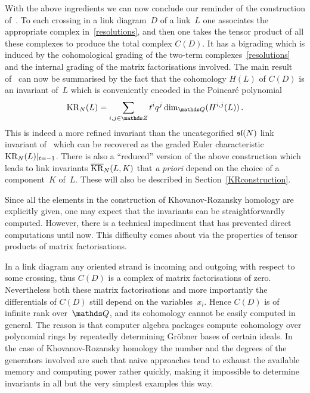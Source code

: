 \documentclass{compositio}
\theoremstyle{definition}
\numberwithin{equation}{section}
\begin{document}
With the above ingredients we can now conclude our reminder of the construction of~\cite{kr0401268}. To each crossing in a link diagram~$D$ of a link~$L$ one associates the appropriate complex in~\eqref{resolutions}, and then one takes the tensor product of all these complexes to produce the total complex $C(D)$. It has a bigrading which is induced by the cohomological grading of the two-term complexes~\eqref{resolutions} and the internal grading of the matrix factorisations involved. The main result of~\cite{kr0401268} can now be summarised by the fact that the cohomology $H(L)$ of $C(D)$ is an invariant of~$L$ which is conveniently encoded in the Poincar\'e polynomial
$$
\KR_{N}(L) = \sum_{i,j\in\nZ} t^{i} q^j \dim_{\nQ}(H^{i,j}(L)) \, . 
$$
This is indeed a more refined invariant than the uncategorified $\mathfrak{sl}(N)$ link invariant of~\cite{RT1990} which can be recovered as the graded Euler characteristic $\operatorname{KR}_{N}(L)|_{t=-1}$. There is also a ``reduced'' version of the above construction which leads to link invariants $\overline{\operatorname{KR}}_{N}(L,K)$ that \emph{a priori} depend on the choice of a component~$K$ of~$L$. These will also be described in Section~\ref{KRconstruction}. 

\medskip

Since all the elements in the construction of Khovanov-Rozansky homology are explicitly given, one may expect that the invariants can be straightforwardly computed. However, there is a technical impediment that has prevented direct computations until now. This difficulty comes about via the properties of tensor products of matrix factorisations. 

In a link diagram any oriented strand is incoming and outgoing with respect to some crossing, thus $C(D)$ is a complex of matrix factorisations of zero. Nevertheless both these matrix factorisations and more importantly the differentials of $C(D)$ still depend on the variables~$x_{i}$. Hence $C(D)$ is of infinite rank over~$\nQ$, and its cohomology cannot be easily computed in general. The reason is that computer algebra packages compute cohomology over polynomial rings by repeatedly determining Gr\"obner bases of certain ideals. In the case of Khovanov-Rozansky homology the number and the degrees of the generators involved are such that naive approaches tend to exhaust the available memory and computing power rather quickly, making it impossible to determine invariants in all but the very simplest examples this way. 
\end{document}
